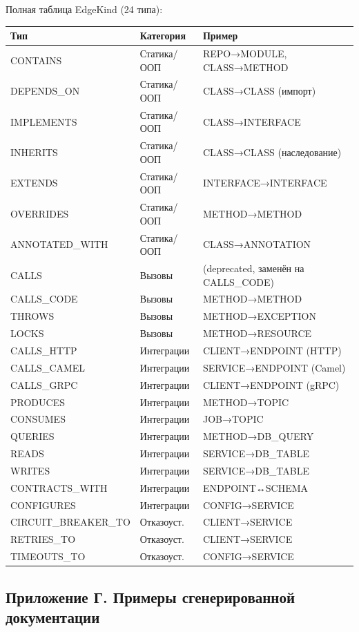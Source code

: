 {Полная таблица EdgeKind (24 типа):

\begin{center}
\begin{tabular}{|l|l|l|}
\hline
Тип & Категория & Пример \\
\hline
CONTAINS & Статика/ООП & REPO→MODULE, CLASS→METHOD \\
DEPENDS\_ON & Статика/ООП & CLASS→CLASS (импорт) \\
IMPLEMENTS & Статика/ООП & CLASS→INTERFACE \\
INHERITS & Статика/ООП & CLASS→CLASS (наследование) \\
EXTENDS & Статика/ООП & INTERFACE→INTERFACE \\
OVERRIDES & Статика/ООП & METHOD→METHOD \\
ANNOTATED\_WITH & Статика/ООП & CLASS→ANNOTATION \\
\hline
CALLS & Вызовы & (deprecated, заменён на CALLS\_CODE) \\
CALLS\_CODE & Вызовы & METHOD→METHOD \\
THROWS & Вызовы & METHOD→EXCEPTION \\
LOCKS & Вызовы & METHOD→RESOURCE \\
\hline
CALLS\_HTTP & Интеграции & CLIENT→ENDPOINT (HTTP) \\
CALLS\_CAMEL & Интеграции & SERVICE→ENDPOINT (Camel) \\
CALLS\_GRPC & Интеграции & CLIENT→ENDPOINT (gRPC) \\
PRODUCES & Интеграции & METHOD→TOPIC \\
CONSUMES & Интеграции & JOB→TOPIC \\
QUERIES & Интеграции & METHOD→DB\_QUERY \\
READS & Интеграции & SERVICE→DB\_TABLE \\
WRITES & Интеграции & SERVICE→DB\_TABLE \\
CONTRACTS\_WITH & Интеграции & ENDPOINT↔SCHEMA \\
CONFIGURES & Интеграции & CONFIG→SERVICE \\
CIRCUIT\_BREAKER\_TO & Отказоуст. & CLIENT→SERVICE \\
RETRIES\_TO & Отказоуст. & CLIENT→SERVICE \\
TIMEOUTS\_TO & Отказоуст. & CONFIG→SERVICE \\
\hline
\end{tabular}
\end{center}}

\subsection*{Приложение Г. Примеры сгенерированной документации}

